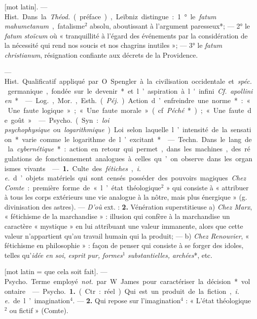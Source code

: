 \begin{itemize}[leftmargin=1cm, label=, itemsep=1pt]
 [mot latin]. — \si{Hist.} Dans la
{\it Théod.} (préface), Leïbniz distingue : 1° le {\it fatum mahumetanum},
fatalisme$^2$ absolu, aboutissant à l’argument paresseux*; — 2° le {\it fatum
stoïcum} où « tranquillité à l'égard des événements par la
considération de la nécessité qui
rend nos soucis et nos chagrins inutiles »; — 3° le {\it fatum christianum},
résignation confiante aux décrets de
la Providence.

 — \si{Hist.} Qualificatif appliqué par O. Spengler à la
civilisation occidentale et {\it spéc.} germanique, fondée sur le devenir*
et l’aspiration à l'infini. {\it Cf.} {\it apollinien}*.

 — \si{Log.}, \si{Mor.}, \si{Esth.} ({\it Péj.}) Action
d’enfreindre une norme* : « Une faute logique »; « Une faute morale »
(cf. {\it Péché}*); « Une faute de goût ».

 — \si{Psycho.} (Syn. :
{\it loi psychophysique} ou {\it logarithmique}).
Loi selon laquelle l’intensité de la
sensation* varie comme le logarithme de l’excitant*.

 — \si{Techn.} Dans le lang. de
la {\it cybernétique}* : action en retour
qui permet, dans les machines, des
régulations de fonctionnement analogues à celles qu’on observe dans
les organismes vivants.

 — {\bf 1.} Culte des {\it fétiches},
{\it i. e.} d’objets matériels qui sont
censés posséder des pouvoirs magiques. {\it Chez Comte} : première forme
de « l’état théologique$^2$ » qui consiste
à « attribuer à tous les corps extérieurs une vie analogue à la nôtre,
mais plus énergique » (g. divinisation des astres). — {\it D'où} ext. :
{\bf 2.} Vénération superstitieuse a) {\it Chez Marx}, « fétichisme de la
marchandise » : illusion qui confère à la marchandise un caractère
« mystique » en lui attribuant une valeur immanente, alors que cette valeur
n’appartient qu'au travail humain qui la produit; — b) {\it Chez Renouvier},
« fétichisme en philosophie » : façon de penser qui consiste à se forger
des idoles, telles qu’{\it idée en soi, esprit pur, formes$^1$ substantielles,
archées}*, etc.

 [mot latin = que cela soit fait]. — \si{Psycho.} Terme employé
{\it not.} par W. James pour caractériser la décision* volontaire.

 — \si{Psycho.} {\bf 1.} (Ctr. : réel). Qui est un produit de la
fiction, {\it i. e.} de l’imagination$^4$. — {\bf 2.} Qui repose sur
l'imagination$^4$ : « L'état théologique$^2$ ou fictif » (Comte).


\end{itemize}
